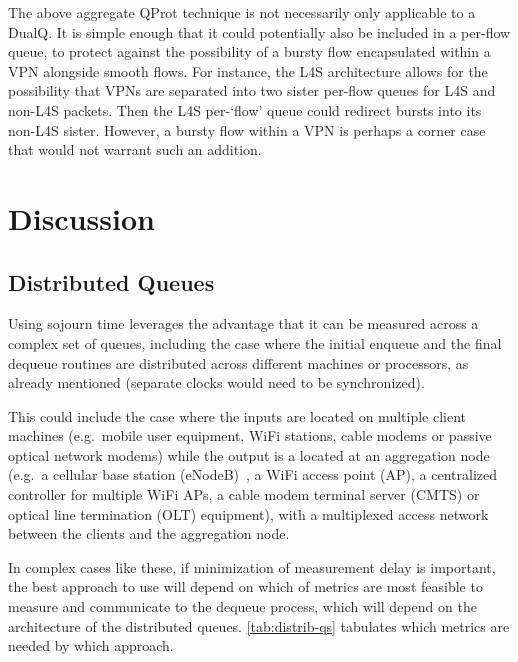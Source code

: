 The above aggregate QProt technique is not necessarily only applicable to a DualQ. It is simple enough that it could potentially also be included in a per-flow queue, to protect against the possibility of a bursty flow encapsulated within a VPN alongside smooth flows. For instance, the L4S architecture allows for the possibility that VPNs are separated into two sister per-flow queues for L4S and non-L4S packets. Then the L4S per-`flow' queue could redirect bursts into its non-L4S sister. However, a bursty flow within a VPN is perhaps a corner case that would not warrant such an addition.

\section{Discussion}\label{sec:discussion}
\subsection{Distributed Queues}\label{sec:sojourn-distrib}

Using sojourn time leverages the advantage that it can be measured across a complex set of queues, including the case where the initial enqueue and the final dequeue routines are distributed across different machines or processors, as already mentioned (separate clocks would need to be synchronized).

This could include the case where the inputs are located on multiple client machines (e.g.\ mobile user equipment, WiFi stations, cable modems or passive optical network modems) while the output is a located at an aggregation node (e.g.\ a cellular base station (eNodeB)~\cite{Tan09:AQM_uplink_patent}, a WiFi access point (AP), a centralized controller for multiple WiFi APs, a cable modem terminal server (CMTS) or optical line termination (OLT) equipment), with a multiplexed access network between the clients and the aggregation node.

In complex cases like these, if minimization of measurement delay is important, the best approach to use will depend on which of metrics are most feasible to measure and communicate to the dequeue process, which will depend on the architecture of the distributed queues. \autoref{tab:distrib-qs} tabulates which metrics are needed by which approach.

